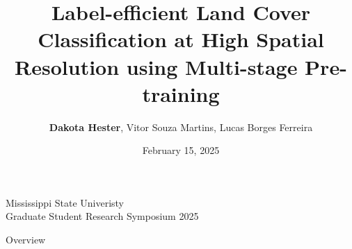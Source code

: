 \documentclass[aspectratio=169, hideallsubsectionså]{beamer}
\title{Label-efficient Land Cover Classification at High Spatial Resolution using Multi-stage Pre-training}
\author{\textbf{Dakota Hester}, Vitor Souza Martins, Lucas Borges Ferreira}
\institute{Mississippi State University\\Department of Agricultural and Biological Engineering}
\date{February 15, 2025}
\begin{document}
\begin{frame}{Mississippi State Univeristy\\Graduate Student Research Symposium 2025}
    \titlepage
\end{frame}

\begin{frame}{Overview}
    \tableofcontents[hideallsubsections]
\end{frame}



\end{document}
